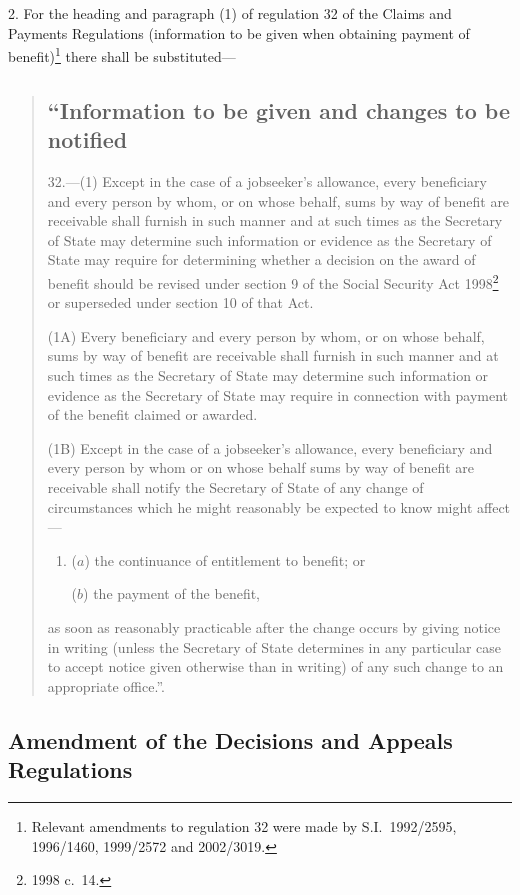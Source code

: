 \documentclass[12pt,a4paper]{article}
\begin{document}
2.  For the heading and paragraph (1) of regulation 32 of the Claims and Payments Regulations (information to be given when obtaining payment of benefit)\footnote{Relevant amendments to regulation 32 were made by S.I.\ 1992/2595, 1996/1460, 1999/2572 and 2002/3019.} there shall be substituted—
\begin{quotation}
\subsection*{“Information to be given and changes to be notified}

32.---(1)  Except in the case of a jobseeker’s allowance, every beneficiary and every person by whom, or on whose behalf, sums by way of benefit are receivable shall furnish in such manner and at such times as the Secretary of State may determine such information or evidence as the Secretary of State may require for determining whether a decision on the award of benefit should be revised under section 9 of the Social Security Act 1998\footnote{1998 c.\ 14.} or superseded under section 10 of that Act.

(1A) Every beneficiary and every person by whom, or on whose behalf, sums by way of benefit are receivable shall furnish in such manner and at such times as the Secretary of State may determine such information or evidence as the Secretary of State may require in connection with payment of the benefit claimed or awarded.

(1B) Except in the case of a jobseeker’s allowance, every beneficiary and every person by whom or on whose behalf sums by way of benefit are receivable shall notify the Secretary of State of any change of circumstances which he might reasonably be expected to know might affect—
\begin{enumerate}\item[]
($a$) the continuance of entitlement to benefit; or

($b$) the payment of the benefit,
\end{enumerate}
as soon as reasonably practicable after the change occurs by giving notice in writing (unless the Secretary of State determines in any particular case to accept notice given otherwise than in writing) of any such change to an appropriate office.”.
\end{quotation}

\subsection[3. Amendment of the Decisions and Appeals Regulations]{Amendment of the Decisions and Appeals Regulations}
\end{document}
